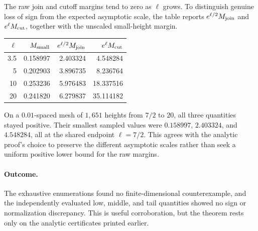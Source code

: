 The raw join and cutoff margins tend to zero as \(\ell\) grows. To
distinguish genuine loss of sign from the expected asymptotic scale, the
table reports \(e^{\ell/2}M_{\rm join}\) and
\(e^\ell M_{\rm cut}\), together with the unscaled small-height margin.
\begin{center}
{\small\setlength{\tabcolsep}{7pt}\renewcommand{\arraystretch}{1.08}
\begin{tabular}{@{}rrrr@{}}
\toprule
\(\ell\) & \(M_{\rm small}\) & \(e^{\ell/2}M_{\rm join}\) & \(e^\ell M_{\rm cut}\)\\ \midrule
3.5 & 0.158997 & 2.403324 & 4.548284\\
5 & 0.202903 & 3.896735 & 8.236764\\
10 & 0.253236 & 5.976483 & 18.337516\\
20 & 0.241820 & 6.279837 & 35.114182\\
\bottomrule
\end{tabular}}
\end{center}
On a \(0.01\)-spaced mesh of \(1{,}651\) heights from \(7/2\) to
\(20\), all three quantities stayed positive. Their smallest sampled
values were \(0.158997\), \(2.403324\), and \(4.548284\), all at the
shared endpoint \(\ell=7/2\). This agrees with the analytic proof's
choice to preserve the different asymptotic scales rather than seek a
uniform positive lower bound for the raw margins.

\paragraph{Outcome.}
The exhaustive enumerations found no finite-dimensional counterexample,
and the independently evaluated low, middle, and tail quantities showed
no sign or normalization discrepancy. This is useful corroboration, but
the theorem rests only on the analytic certificates printed earlier.
